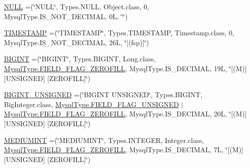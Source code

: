 \begin{DoxyCompactItemize}
\item 
\mbox{\hyperlink{enumcom_1_1mysql_1_1cj_1_1_mysql_type_afd999a269aedd95acf6ae2453b95e2a3}{N\+U\+LL}} =(\char`\"{}N\+U\+LL\char`\"{}, Types.\+N\+U\+LL, Object.\+class, 0, Mysql\+Type.\+I\+S\+\_\+\+N\+O\+T\+\_\+\+D\+E\+C\+I\+M\+AL, 0\+L, \char`\"{}\char`\"{})
\item 
\mbox{\hyperlink{enumcom_1_1mysql_1_1cj_1_1_mysql_type_a8d26bb8a1cf3f337d3294ff11f50c5ae}{T\+I\+M\+E\+S\+T\+A\+MP}} =(\char`\"{}T\+I\+M\+E\+S\+T\+A\+MP\char`\"{}, Types.\+T\+I\+M\+E\+S\+T\+A\+MP, Timestamp.\+class, 0, Mysql\+Type.\+I\+S\+\_\+\+N\+O\+T\+\_\+\+D\+E\+C\+I\+M\+AL, 26\+L, \char`\"{}\mbox{[}(fsp)\mbox{]}\char`\"{})
\item 
\mbox{\hyperlink{enumcom_1_1mysql_1_1cj_1_1_mysql_type_a5e0b78b90c1ad86e03b108c01d729118}{B\+I\+G\+I\+NT}} =(\char`\"{}B\+I\+G\+I\+NT\char`\"{}, Types.\+B\+I\+G\+I\+NT, Long.\+class, \mbox{\hyperlink{enumcom_1_1mysql_1_1cj_1_1_mysql_type_abb76a1f2f3dac9a30d1b559b8ba66a48}{Mysql\+Type.\+F\+I\+E\+L\+D\+\_\+\+F\+L\+A\+G\+\_\+\+Z\+E\+R\+O\+F\+I\+LL}}, Mysql\+Type.\+I\+S\+\_\+\+D\+E\+C\+I\+M\+AL, 19\+L, \char`\"{}\mbox{[}(\+M)\mbox{]} \mbox{[}\+U\+N\+S\+I\+G\+N\+E\+D\mbox{]} \mbox{[}\+Z\+E\+R\+O\+F\+I\+L\+L\mbox{]}\char`\"{})
\item 
\mbox{\hyperlink{enumcom_1_1mysql_1_1cj_1_1_mysql_type_a4cb24739cd3da8ce7e10b6cdb0e13765}{B\+I\+G\+I\+N\+T\+\_\+\+U\+N\+S\+I\+G\+N\+ED}} =(\char`\"{}B\+I\+G\+I\+NT U\+N\+S\+I\+G\+N\+ED\char`\"{}, Types.\+B\+I\+G\+I\+NT, Big\+Integer.\+class, \mbox{\hyperlink{enumcom_1_1mysql_1_1cj_1_1_mysql_type_a2c6701614559b1ad9955cdc4ca6337e2}{Mysql\+Type.\+F\+I\+E\+L\+D\+\_\+\+F\+L\+A\+G\+\_\+\+U\+N\+S\+I\+G\+N\+ED}} $\vert$ \mbox{\hyperlink{enumcom_1_1mysql_1_1cj_1_1_mysql_type_abb76a1f2f3dac9a30d1b559b8ba66a48}{Mysql\+Type.\+F\+I\+E\+L\+D\+\_\+\+F\+L\+A\+G\+\_\+\+Z\+E\+R\+O\+F\+I\+LL}}, Mysql\+Type.\+I\+S\+\_\+\+D\+E\+C\+I\+M\+AL, 20\+L, \char`\"{}\mbox{[}(\+M)\mbox{]} \mbox{[}\+U\+N\+S\+I\+G\+N\+E\+D\mbox{]} \mbox{[}\+Z\+E\+R\+O\+F\+I\+L\+L\mbox{]}\char`\"{})
\item 
\mbox{\hyperlink{enumcom_1_1mysql_1_1cj_1_1_mysql_type_ab95197c592f1fbd01abed94679b373ca}{M\+E\+D\+I\+U\+M\+I\+NT}} =(\char`\"{}M\+E\+D\+I\+U\+M\+I\+NT\char`\"{}, Types.\+I\+N\+T\+E\+G\+ER, Integer.\+class, \mbox{\hyperlink{enumcom_1_1mysql_1_1cj_1_1_mysql_type_abb76a1f2f3dac9a30d1b559b8ba66a48}{Mysql\+Type.\+F\+I\+E\+L\+D\+\_\+\+F\+L\+A\+G\+\_\+\+Z\+E\+R\+O\+F\+I\+LL}}, Mysql\+Type.\+I\+S\+\_\+\+D\+E\+C\+I\+M\+AL, 7\+L, \char`\"{}\mbox{[}(\+M)\mbox{]} \mbox{[}\+U\+N\+S\+I\+G\+N\+E\+D\mbox{]} \mbox{[}\+Z\+E\+R\+O\+F\+I\+L\+L\mbox{]}\char`\"{})

\end{DoxyCompactItemize}
